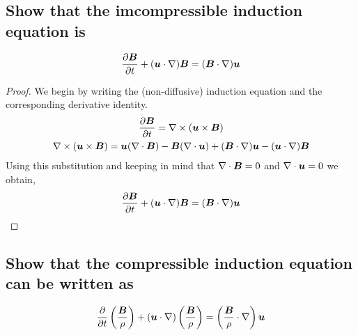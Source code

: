 \documentclass{article}
\begin{document}
\section{}

\subsection{Show that the imcompressible induction equation is}
\begin{gather*}
    \frac{\partial \boldsymbol{B}}{\partial t} + (\boldsymbol{u}\cdot\nabla)\boldsymbol{B} = (\boldsymbol{B}\cdot\nabla)\boldsymbol{u}
\end{gather*}

\begin{proof}
    We begin by writing the (non-diffusive) induction equation and the corresponding derivative
    identity. 
    \begin{gather*}
        \frac{\partial \boldsymbol{B}}{\partial t} = \nabla\times(\boldsymbol{u}\times\boldsymbol{B})\\
        \nabla\times(\boldsymbol{u}\times\boldsymbol{B}) = \boldsymbol{u}(\nabla \cdot{\boldsymbol{B}})-\boldsymbol{B}(\nabla \cdot{\boldsymbol{u}}) +
        (\boldsymbol{B}\cdot\nabla)\boldsymbol{u} - (\boldsymbol{u}\cdot\nabla)\boldsymbol{B}
    \end{gather*}
    Using this substitution and keeping in mind that $\nabla \cdot{\boldsymbol{B}} = 0$ and
    $\nabla \cdot{\boldsymbol{u}} = 0$ we obtain, 
    \begin{gather*}
        \frac{\partial \boldsymbol{B}}{\partial t} + (\boldsymbol{u}\cdot\nabla)\boldsymbol{B} = (\boldsymbol{B}\cdot\nabla)\boldsymbol{u}
    \end{gather*}
\end{proof}

\subsection{Show that the compressible induction equation can be written as}
\begin{gather*}
    \frac{\partial }{\partial t}\left(\frac{\boldsymbol{B}}{\rho}\right) +
    (\boldsymbol{u}\cdot\nabla)\left(\frac{\boldsymbol{B}}{\rho}\right) =
    \left(\frac{\boldsymbol{B}}{\rho}\cdot\nabla\right)\boldsymbol{u}
\end{gather*}
\end{document}
